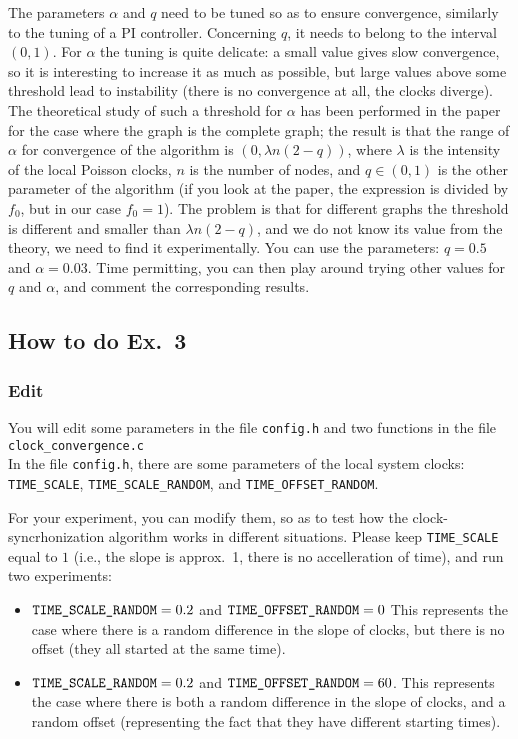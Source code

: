 \documentclass[oneside]{article}
\begin{document}
The parameters $\alpha$ and $q$ need to be tuned so as to ensure convergence, similarly to the tuning of a PI controller.
Concerning $q$, it needs to belong to the interval $(0,1)$. For $\alpha$ the tuning is quite delicate: a small value gives slow convergence, so it is interesting to increase it as much as possible, but large values above some threshold lead to instability (there is no convergence at all, the clocks diverge). The theoretical study of such a threshold for $\alpha$ has been performed in the paper \cite{RandSync-journal} for the case where the graph is the complete graph; the result is that the range of $\alpha$ for convergence of the algorithm is $(0, \lambda n (2-q))$, where $\lambda$ is the intensity of the local Poisson clocks, $n$ is the number of nodes, and $q \in (0,1) $ is the other parameter of the algorithm (if you look at the paper, the expression is divided by $f_0$, but in our case $f_0=1$). The problem is that for different graphs the threshold is different and smaller than $\lambda n (2-q)$, and we do not know its value from the theory, we need to find it experimentally. You can use the parameters: $q=0.5$ and $\alpha = 0.03$. Time permitting, you can then play around trying other values for $q$ and $\alpha$, and comment the corresponding results.




\subsection{How to do Ex.~3}

\subsubsection{Edit}
You will edit some parameters in the file \verb=config.h= and two functions in the file \verb=clock_convergence.c=\\


In the file \verb=config.h=, there are some parameters of the local system clocks:
\verb=TIME_SCALE=, \verb=TIME_SCALE_RANDOM=, and \verb=TIME_OFFSET_RANDOM=.

For your experiment, you can modify them, so as to test how the clock-syncrhonization algorithm works in different situations. 
Please keep \verb=TIME_SCALE= equal to $1$ (i.e., the slope is approx.~1, there is no accelleration of time), and run two experiments:
\begin{itemize}
\item
$\verb=TIME_SCALE_RANDOM= =0.2 $ and $ \verb=TIME_OFFSET_RANDOM= = 0$
This represents the case where there is a random difference in the slope of clocks, but there is no offset (they all started at the same time).
\item
$\verb=TIME_SCALE_RANDOM= =0.2 $ and $ \verb=TIME_OFFSET_RANDOM= = 60$.
This represents the case where there is both a random difference in the slope of clocks, and a random offset (representing the fact that they have different starting times).
\end{itemize}
\end{document}
